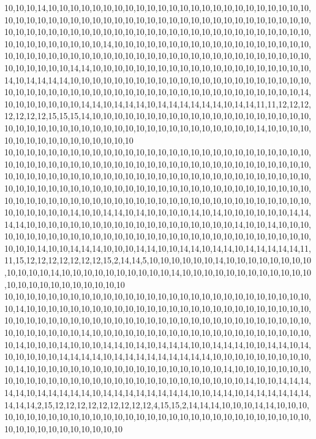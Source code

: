 10,10,10,14,10,10,10,10,10,10,10,10,10,10,10,10,10,10,10,10,10,10,10,10,10,10,10,10,10,10,10,10,10,10,10,10,10,10,10,10,10,10,10,10,10,10,10,10,10,10,10,10,10,10,10,10,10,10,10,10,10,10,10,10,10,10,10,10,10,10,10,10,10,10,10,10,10,10,10,10,10,10,10,10,10,10,10,10,10,10,10,10,10,14,10,10,10,10,10,10,10,10,10,10,10,10,10,10,10,10,10,10,10,10,10,10,10,10,10,10,10,10,10,10,10,10,10,10,10,10,10,10,10,10,10,10,10,10,10,10,10,10,10,10,10,10,14,14,10,10,10,10,10,10,10,10,10,10,10,10,10,10,10,10,10,10,10,10,14,10,14,14,14,14,10,10,10,10,10,10,10,10,10,10,10,10,10,10,10,10,10,10,10,10,10,10,10,10,10,10,10,10,10,10,10,10,10,10,10,10,10,10,10,10,10,10,10,10,10,10,10,10,10,14,10,10,10,10,10,10,10,14,14,10,14,14,14,10,14,14,14,14,14,14,10,14,14,11,11,12,12,12,12,12,12,12,15,15,15,14,10,10,10,10,10,10,10,10,10,10,10,10,10,10,10,10,10,10,10,10,10,10,10,10,10,10,10,10,10,10,10,10,10,10,10,10,10,10,10,10,10,10,10,14,10,10,10,10,10,10,10,10,10,10,10,10,10,10,10,10
10,10,10,10,10,10,10,10,10,10,10,10,10,10,10,10,10,10,10,10,10,10,10,10,10,10,10,10,10,10,10,10,10,10,10,10,10,10,10,10,10,10,10,10,10,10,10,10,10,10,10,10,10,10,10,10,10,10,10,10,10,10,10,10,10,10,10,10,10,10,10,10,10,10,10,10,10,10,10,10,10,10,10,10,10,10,10,10,10,10,10,10,10,10,10,10,10,10,10,10,10,10,10,10,10,10,10,10,10,10,10,10,10,10,10,10,10,10,10,10,10,10,10,10,10,10,10,10,10,10,10,10,10,10,10,10,10,10,10,10,10,10,10,10,10,10,14,10,10,14,14,10,14,10,10,10,10,14,10,14,10,10,10,10,10,10,14,14,14,14,10,10,10,10,10,10,10,10,10,10,10,10,10,10,10,10,10,10,10,14,10,10,14,10,10,10,10,10,10,10,10,10,10,10,10,10,10,10,10,10,10,10,10,10,10,10,10,10,10,10,10,10,10,10,10,10,10,14,10,10,14,14,14,10,10,10,14,14,10,10,14,14,10,14,14,10,14,14,14,14,14,11,11,15,12,12,12,12,12,12,12,15,2,14,14,5,10,10,10,10,10,10,14,10,10,10,10,10,10,10,10,10,10,10,10,14,10,10,10,10,10,10,10,10,10,10,14,10,10,10,10,10,10,10,10,10,10,10,10,10,10,10,10,10,10,10,10,10,10,10
10,10,10,10,10,10,10,10,10,10,10,10,10,10,10,10,10,10,10,10,10,10,10,10,10,10,10,10,10,14,10,10,10,10,10,10,10,10,10,10,10,10,10,10,10,10,10,10,10,10,10,10,10,10,10,10,10,10,10,10,10,10,10,10,10,10,10,10,10,10,10,10,10,10,10,10,10,10,10,10,10,10,10,10,10,10,10,10,10,10,10,14,10,10,10,10,10,10,10,10,10,10,10,10,10,10,10,10,10,10,10,10,10,14,10,10,10,14,10,10,10,14,14,10,14,10,14,14,14,10,10,14,14,14,10,10,14,14,10,14,10,10,10,10,10,14,14,14,14,10,14,14,14,14,14,14,14,14,14,10,10,10,10,10,10,10,10,10,10,14,10,10,10,10,10,10,10,10,10,10,10,10,10,10,10,10,10,10,14,10,10,10,10,10,10,10,10,10,10,10,10,10,10,10,10,10,10,10,10,10,10,10,10,10,10,10,10,10,14,10,10,14,14,14,14,14,10,14,14,14,14,14,10,14,14,14,14,14,14,14,14,10,10,14,14,10,14,14,14,14,14,14,14,14,14,2,15,12,12,12,12,12,12,12,12,12,4,15,15,2,14,14,14,10,10,10,14,14,10,10,10,10,10,10,10,10,10,10,10,10,10,10,10,10,10,10,10,10,10,10,10,10,10,10,10,10,10,10,10,10,10,10,10,10,10,10,10,10,10,10
